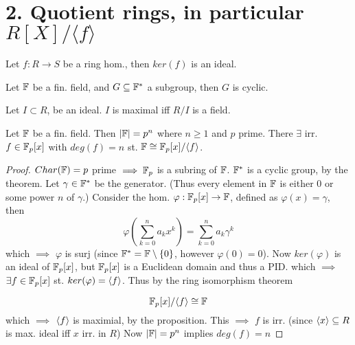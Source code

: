 \chapter*{2. Quotient rings, in particular $R[X]/\langle f \rangle$}
\begin{proposition}
  Let $f: R \to S$ be a ring hom., then $ker(f)$ is an ideal.
\end{proposition}
\begin{theorem}[Gauss]
Let $\mathbb{F}$ be a fin. field, and $G \subseteq \mathbb{F}^{*}$ a subgroup, then $G$ is cyclic.
\end{theorem}
\begin{proposition}
  Let $I \subset R$, be an ideal. $I$ is maximal iff $R/I$ is a field.
\end{proposition}
\begin{lemma}
  Let $\mathbb{F}$ be a fin. field. Then $|\mathbb{F}| = p^{n}$ where $n \geq 1$ and $p$ prime. There $\exists$ irr. $f \in \mathbb{F}_{p}[x]$ with $deg(f) = n$ st. $\mathbb{F} \cong \mathbb{F}_{p}[x] / \langle f\rangle$.
\end{lemma}

\begin{proof}
  $Char(\mathbb{F}) = p$ prime $\implies \mathbb{F}_{p}$ is a subring of $\mathbb{F}$. $\mathbb{F}^{*}$ is a cyclic group, by the theorem. Let $\gamma \in \mathbb{F}^{*}$ be the generator. (Thus every element in $\mathbb{F}$ is either $0$ or some power $n$ of $\gamma$.)
  Consider the hom. $\varphi: \mathbb{F}_{p}[x] \to \mathbb{F}$, defined as $\varphi(x) = \gamma$, then
  \begin{equation*}
    \varphi\left(\sum^{n}_{k = 0} a_{k} x^{k}\right) = \sum^{n}_{k = 0} a_{k} \gamma^{k}
  \end{equation*}
  which $\implies$ $\varphi$ is surj (since $\mathbb{F}^{*} = \mathbb{F} \setminus \{0\}$, however $\varphi(0) = 0$). Now $ker(\varphi)$ is an ideal of $\mathbb{F}_{p}[x]$, but $\mathbb{F}_{p}[x]$ is a Euclidean domain and thus a PID. which $\implies$ $\exists f \in \mathbb{F}_{p}[x]$  st. $ker(\varphi) = \langle f\rangle$. Thus by the ring isomorphism theorem

  \begin{equation*}
    \mathbb{F}_{p}[x] / \langle f\rangle \cong \mathbb{F}
  \end{equation*}
  which $\implies$ $\langle f\rangle$ is maximial, by the proposition. This $\implies$ $f$ is irr. (since $\langle x\rangle \subseteq R$ is max. ideal iff $x$ irr. in $R$) Now $\lvert\mathbb{F} \rvert = p^{n}$ implies $deg(f) = n$
\end{proof}
